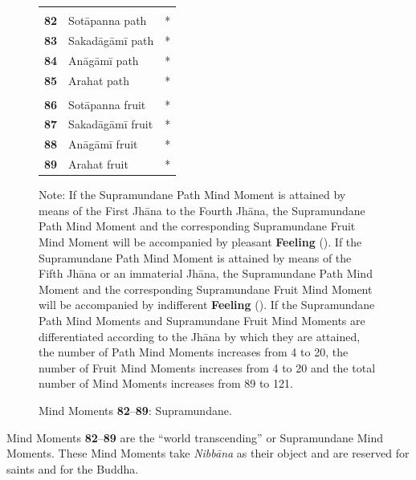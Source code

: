 \begin{figure}[H]
\setlength{\tabcolsep}{0pt}
\renewcommand{\arraystretch}{1.1}

\begin{center}
\noindent\begin{tabular}{P{.05\textwidth}L{0.25\textwidth}C{.05\textwidth}}
\toprule
{} \\
\textbf{82} & Sotāpanna path & * \\
\textbf{83} & Sakadāgāmī path & * \\
\textbf{84} & Anāgāmī path & * \\
\textbf{85} & Arahat path & * \\
\midrule
{} \\
\textbf{86} & Sotāpanna fruit & * \\
\textbf{87} & Sakadāgāmī fruit & * \\
\textbf{88} & Anāgāmī fruit & * \\
\textbf{89} & Arahat fruit & * \\
\bottomrule
\end{tabular}
\end{center}

{\small \noindent * Note: If the Supramundane Path Mind Moment is attained by means of the First Jhāna to the Fourth Jhāna, the Supramundane Path Mind Moment and the corresponding Supramundane Fruit Mind Moment will be accompanied by pleasant \textbf{Feeling} (\smiley). If the Supramundane Path Mind Moment is attained by means of the Fifth Jhāna or an immaterial Jhāna, the Supramundane Path Mind Moment and the corresponding Supramundane Fruit Mind Moment will be accompanied by indifferent \textbf{Feeling} (\neutral). If the Supramundane Path Mind Moments and Supramundane Fruit Mind Moments are differentiated according to the Jhāna by which they are attained, the number of Path Mind Moments increases from 4 to 20, the number of Fruit Mind Moments increases from 4 to 20 and the total number of Mind Moments increases from 89 to 121.}

\caption{Mind Moments \textbf{82}--\textbf{89}: Supramundane.}
\label{fig:82to89}
\end{figure}

Mind Moments \textbf{82}--\textbf{89} are the “world transcending” or Supramundane Mind Moments. These Mind Moments take \textit{Nibbāna} as their object and are reserved for saints and for the Buddha.

